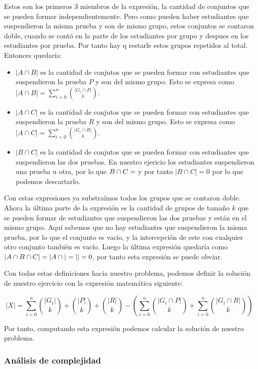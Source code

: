 \documentclass{article}
\begin{document}
Estos son los primeros 3 miembros de la expresión, la cantidad de conjuntos que se pueden formar independientemente. Pero como pueden haber estudiantes que suspendieron la misma prueba y son de mismo grupo, estos conjuntos se contaron doble, cuando se contó en la parte de los estudiantes por grupo y despues en los estudiantes por prueba. Por tanto hay q restarle estos grupos repetidos al total. Entonces quedaría:

\begin{itemize}
    \item $|A \cap B|$ es la cantidad de conjutos que se pueden formar con estudiantes que suspendieron la prueba $P$ y son del mismo grupo. Esto se expresa como $|A \cap B| = \sum_{i=0}^{n} {|G_i \cap P| \choose k}$.
    \item $|A \cap C|$ es la cantidad de conjutos que se pueden formar con estudiantes que suspendieron la prueba $R$ y son del mismo grupo. Esto se expresa como $|A \cap C| = \sum_{i=0}^{n} {|G_i \cap R| \choose k}$.
    \item $|B \cap C|$ es la cantidad de conjutos que se pueden formar con estudiantes que suspendieron las dos pruebas. En nuestro ejericio los estudiantes suspendieron una prueba u otra, por lo que $B \cap C = \empty$ y por tanto $|B \cap C| = 0$ por lo que podemos descartarlo.
\end{itemize}

Con estas expresiones ya substraímos todos los grupos que se contaron doble. Ahora la última parte de la expresión es la cantidad de grupos de tamaño $k$ que se pueden formar de estudiantes que suspendieron las dos pruebas y están en el mismo grupo. Aquí sabemos que no hay estudiantes que suspendieron la misma prueba, por lo que el conjunto es vacío, y la intercepción de este con cualquier otro conjunto también es vacío. Luego la última expresión quedaría como $|A \cap B \cap C| = |A \cap \empty| = |\empty| = 0$, por tanto esta expresión se puede obviar.

Con todas estas definiciones hacia nuestro problema, podemos definir la solución de nuestro ejercicio con la expresión matemática siguiente:

$$
    |X| = \sum_{i=0}^{n} {|G_i| \choose k} + {|P| \choose k} + {|R| \choose k} - (\sum_{i=0}^{n} {|G_i \cap P| \choose k} + \sum_{i=0}^{n} {|G_i \cap R| \choose k})
$$

Por tanto, computando esta expresión podemos calcular la solución de nuestro problema.

\subsubsection{Análisis de complejidad}
\end{document}
